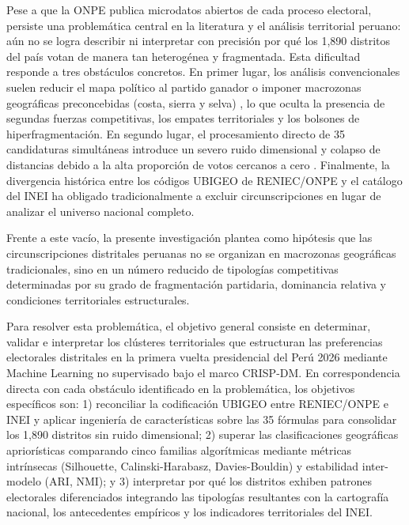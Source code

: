 \documentclass[conference,10pt,letterpaper]{IEEEtran}
\begin{document}
Pese a que la ONPE publica microdatos abiertos de cada proceso electoral, persiste una problemática central en la literatura y el análisis territorial peruano: aún no se logra describir ni interpretar con precisión por qué los 1,890 distritos del país votan de manera tan heterogénea y fragmentada. Esta dificultad responde a tres obstáculos concretos. En primer lugar, los análisis convencionales suelen reducir el mapa político al partido ganador o imponer macrozonas geográficas preconcebidas (costa, sierra y selva) \cite{quintanilla2020, encinas2021}, lo que oculta la presencia de segundas fuerzas competitivas, los empates territoriales y los bolsones de hiperfragmentación. En segundo lugar, el procesamiento directo de 35 candidaturas simultáneas introduce un severo ruido dimensional y colapso de distancias debido a la alta proporción de votos cercanos a cero \cite{diaz2025}. Finalmente, la divergencia histórica entre los códigos UBIGEO de RENIEC/ONPE y el catálogo del INEI \cite{inei2026_directorio} ha obligado tradicionalmente a excluir circunscripciones en lugar de analizar el universo nacional completo.

Frente a este vacío, la presente investigación plantea como hipótesis que las circunscripciones distritales peruanas no se organizan en macrozonas geográficas tradicionales, sino en un número reducido de tipologías competitivas determinadas por su grado de fragmentación partidaria, dominancia relativa y condiciones territoriales estructurales.

Para resolver esta problemática, el objetivo general consiste en determinar, validar e interpretar los clústeres territoriales que estructuran las preferencias electorales distritales en la primera vuelta presidencial del Perú 2026 mediante Machine Learning no supervisado bajo el marco CRISP-DM. En correspondencia directa con cada obstáculo identificado en la problemática, los objetivos específicos son: 1) reconciliar la codificación UBIGEO entre RENIEC/ONPE e INEI y aplicar ingeniería de características sobre las 35 fórmulas para consolidar los 1,890 distritos sin ruido dimensional; 2) superar las clasificaciones geográficas apriorísticas comparando cinco familias algorítmicas mediante métricas intrínsecas (Silhouette, Calinski-Harabasz, Davies-Bouldin) y estabilidad inter-modelo (ARI, NMI); y 3) interpretar por qué los distritos exhiben patrones electorales diferenciados integrando las tipologías resultantes con la cartografía nacional, los antecedentes empíricos y los indicadores territoriales del INEI.
\end{document}
